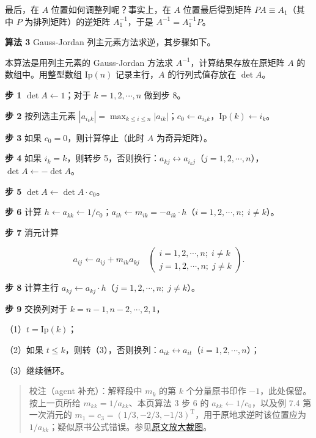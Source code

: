 \documentclass[
  10pt,
  fontset=fandol]{ctexart}
\begin{document}
最后，在 \(A\) 位置如何调整列呢？事实上，在 \(A\) 位置最后得到矩阵 \(PA\equiv A_1\)（其中 \(P\) 为排列矩阵）的逆矩阵 \(A_1^{-1}\)，于是 \(A^{-1}=A_1^{-1}P\)。

\textbf{算法 3} Gauss-Jordan 列主元素方法求逆，其步骤如下。

本算法是用列主元素的 Gauss-Jordan 方法求 \(A^{-1}\)，计算结果存放在原矩阵 \(A\) 的数组中。用整型数组 \(\mathrm{Ip}(n)\) 记录主行，\(A\) 的行列式值存放在 \(\det A\)。

\textbf{步 1} \(\det A\leftarrow1\)；对于 \(k=1,2,\cdots,n\) 做到步 8。

\textbf{步 2} 按列选主元素 \(|a_{i_kk}|=\max_{k\le i\le n}|a_{ik}|\)；\(c_0\leftarrow a_{i_kk}\)，\(\mathrm{Ip}(k)\leftarrow i_k\)。

\textbf{步 3} 如果 \(c_0=0\)，则计算停止（此时 \(A\) 为奇异矩阵）。

\textbf{步 4} 如果 \(i_k=k\)，则转步 5，否则换行：\(a_{kj}\leftrightarrow a_{i_kj}\)（\(j=1,2,\cdots,n\)），\(\det A\leftarrow-\det A\)。

\textbf{步 5} \(\det A\leftarrow\det A\cdot c_0\)。

\textbf{步 6} 计算 \(h\leftarrow a_{kk}\leftarrow1/c_0\)；\(a_{ik}\leftarrow m_{ik}=-a_{ik}\cdot h\)（\(i=1,2,\cdots,n;\;i\ne k\)）。

\textbf{步 7} 消元计算

\[a_{ij}\leftarrow a_{ij}+m_{ik}a_{kj}\quad
\left(\begin{array}{l}i=1,2,\cdots,n;\;i\ne k\\j=1,2,\cdots,n;\;j\ne k\end{array}\right).\]

\textbf{步 8} 计算主行 \(a_{kj}\leftarrow a_{kj}\cdot h\)（\(j=1,2,\cdots,n;\;j\ne k\)）。

\textbf{步 9} 交换列对于 \(k=n-1,n-2,\cdots,2,1\)，

（1）\(t=\mathrm{Ip}(k)\)；

（2）如果 \(t\le k\)，则转（3），否则换列：\(a_{ik}\leftrightarrow a_{it}\)（\(i=1,2,\cdots,n\)）；

（3）继续循环。

\begin{quote}
校注（agent 补充）：解释段中 \(m_k\) 的第 \(k\) 个分量原书印作 \(-1\)，此处保留。按上一页所给 \(m_{kk}=1/a_{kk}\)、本页算法 3 步 6 的 \(a_{kk}\leftarrow1/c_0\)，以及例 7.4 第一次消元的 \(m_1=c_3=(1/3,-2/3,-1/3)^{\mathrm T}\)，用于原地求逆时该位置应为 \(1/a_{kk}\)；疑似原书公式错误。参见\href{../../../staging/ch07a/assets/pdf-190-multiplier-detail.png}{原文放大裁图}。
\end{quote}
\end{document}
